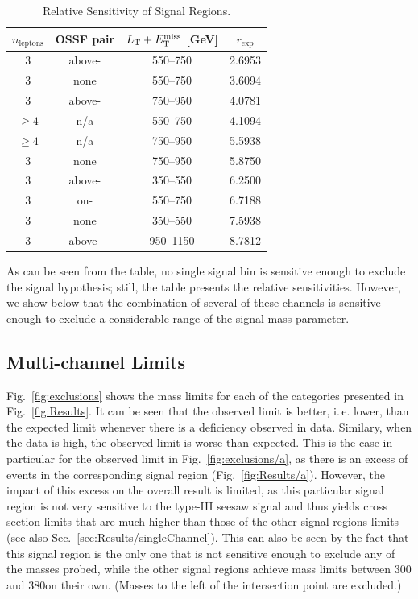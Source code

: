 \begin{table}
\centering
\caption{Relative Sensitivity of Signal Regions.} \label{tab:topSensitivity}
\begin{tabular}{cccc}
\hline\hline
$n_\textrm{leptons}$ & OSSF pair & $L_\textrm{T} + E_{\mathrm{T}}^{\text{miss}}$ [GeV] & $r_\textrm{exp}$\\
\hline
3        & above-\Z & 550--750 & 2.6953\\
3        & none     & 550--750 & 3.6094\\
3        & above-\Z & 750--950 & 4.0781\\
$\geq 4$ & n/a      & 550--750 & 4.1094\\
$\geq 4$ & n/a      & 750--950 & 5.5938\\
\hline
3        & none     & 750--950 & 5.8750\\
3        & above-\Z & 350--550 & 6.2500\\
3        & on-\Z    & 550--750 & 6.7188\\
3        & none     & 350--550 & 7.5938\\
3        & above-\Z & 950--1150 & 8.7812\\
\end{tabular}
\end{table}

As can be seen from the table, no single signal bin is sensitive enough to exclude the signal hypothesis; still, the table presents the relative sensitivities. However, we show below that the combination of several of these channels is sensitive enough to exclude a considerable range of the signal mass parameter.

\subsection{Multi-channel Limits}
Fig.~\ref{fig:exclusions} shows the mass limits for each of the categories presented in Fig.~\ref{fig:Results}. It can be seen that the observed limit is better, i.\,e. lower, than the expected limit whenever there is a deficiency observed in data. Similary, when the data is high, the observed limit is worse than expected. This is the case in particular for the observed limit in Fig.~\ref{fig:exclusions/a}, as there is an excess of events in the corresponding signal region (Fig.~\ref{fig:Results/a}). However, the impact of this excess on the overall result is limited, as this particular signal region is not very sensitive to the type-III seesaw signal and thus yields cross section limits that are much higher than those of the other signal regions limits (see also Sec.~\ref{sec:Results/singleChannel}). This can also be seen by the fact that this signal region is the only one that is not sensitive enough to exclude any of the masses probed, while the other signal regions achieve mass limits between 300 and 380\GeV on their own. (Masses to the left of the intersection point are excluded.)

